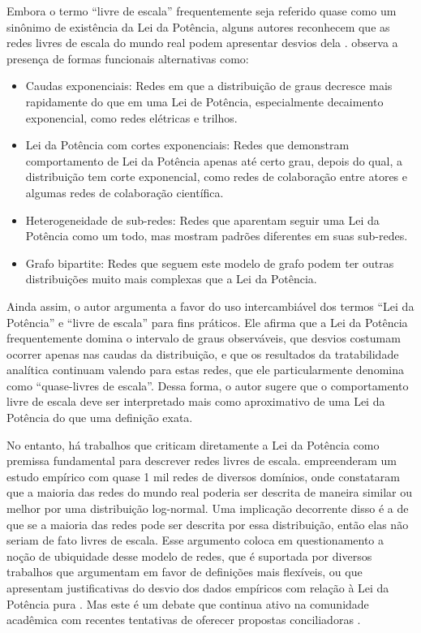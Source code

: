 \documentclass[12pt,oneside,a4paper,brazil,sumario=tradicional]{abntex2}
\begin{document}
Embora o termo “livre de escala” frequentemente seja referido quase como um sinônimo de existência da Lei da Potência, alguns autores reconhecem que as redes livres de escala do mundo real podem apresentar desvios dela \cite{smith2020, meng2023, crane2015}.  observa a presença de formas funcionais alternativas como:

\begin{itemize}
  \item Caudas exponenciais: Redes em que a distribuição de graus decresce mais rapidamente do que em uma Lei de Potência, especialmente decaimento exponencial, como redes elétricas e trilhos.
  \item Lei da Potência com cortes exponenciais: Redes que demonstram comportamento de Lei da Potência apenas até certo grau, depois do qual, a distribuição tem corte exponencial, como redes de colaboração entre atores e algumas redes de colaboração científica.
  \item Heterogeneidade de sub-redes: Redes que aparentam seguir uma Lei da Potência como um todo, mas mostram padrões diferentes em suas sub-redes.
  \item Grafo bipartite: Redes que seguem este modelo de grafo podem ter outras distribuições muito mais complexas que a Lei da Potência.
\end{itemize}
Ainda assim, o autor argumenta a favor do uso intercambiável dos termos “Lei da Potência” e “livre de escala” para fins práticos. Ele afirma que a Lei da Potência frequentemente domina o intervalo de graus observáveis, que desvios costumam ocorrer apenas nas caudas da distribuição, e que os resultados da tratabilidade analítica continuam valendo para estas redes, que ele particularmente denomina como “quase-livres de escala”. Dessa forma, o autor sugere que o comportamento livre de escala deve ser interpretado mais como aproximativo de uma Lei da Potência do que uma definição exata.

No entanto, há trabalhos que criticam diretamente a Lei da Potência como premissa fundamental para descrever redes livres de escala.  empreenderam um estudo empírico com quase 1 mil redes de diversos domínios, onde constataram que a maioria das redes do mundo real poderia ser descrita de maneira similar ou melhor por uma distribuição log-normal. Uma implicação decorrente disso é a de que se a maioria das redes pode ser descrita por essa distribuição, então elas não seriam de fato livres de escala. Esse argumento coloca em questionamento a noção de ubiquidade desse modelo de redes, que é suportada por diversos trabalhos que argumentam em favor de definições mais flexíveis, ou que apresentam justificativas do desvio dos dados empíricos com relação à Lei da Potência pura \cite{artico2020, serafino2021, voitalov2019, zhang2021}. Mas este é um debate que continua ativo na comunidade acadêmica com recentes tentativas de oferecer propostas conciliadoras  \cite{holme2019}.
\end{document}
